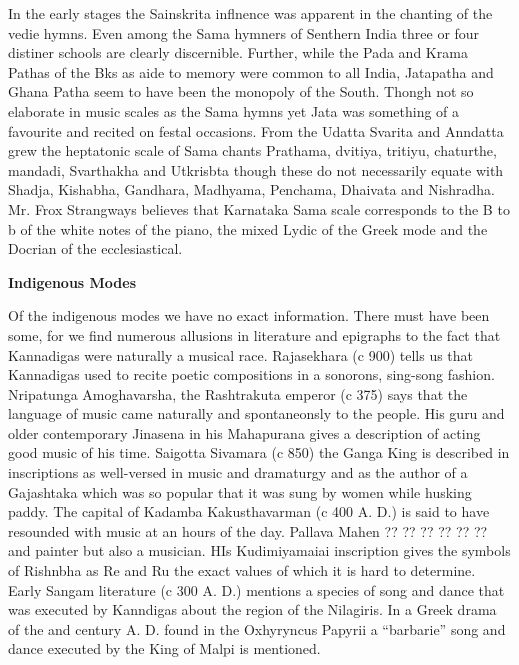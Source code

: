 \documentclass{book}
\begin{document}
In the early stages the Sainskrita inflnence was apparent in the
chanting of the vedie hymns. Even among the Sama hymners of Senthern
India three or four distiner schools are clearly discernible. Further,
while the Pada and Krama Pathas of the Bks as aide to memory were
common to all India, Jatapatha and Ghana Patha seem to have been the
monopoly of the South. Thongh not so elaborate in music scales as the
Sama hymns yet Jata was something of a favourite and recited on festal
occasions. From the Udatta Svarita and Anndatta grew the heptatonic
scale of Sama  chants Prathama, dvitiya, tritiyu, chaturthe, mandadi,
Svarthakha and Utkrisbta though these do not necessarily equate with
Shadja, Kishabha, Gandhara, Madhyama, Penchama, Dhaivata and
Nishradha. Mr. Frox Strangways believes that Karnataka Sama scale
corresponds to the B to b of the white notes of the piano, the mixed
Lydic of the Greek mode and the Docrian of the ecclesiastical.

\begin{center}
\textbf{Indigenous Modes}
\end{center}

Of the indigenous modes we have no exact information. There must have
been some, for we find numerous allusions in literature and epigraphs
to the fact that Kannadigas were naturally a musical race. Rajasekhara
(c 900) tells us that Kannadigas used to recite poetic compositions in
a sonorons, sing-song fashion. Nripatunga Amoghavarsha, the
Rashtrakuta emperor (c 375) says that the language of music came
naturally and spontaneonsly to the people. His guru and older
contemporary Jinasena in his Mahapurana gives a description of acting
good music of his time. Saigotta Sivamara (c 850) the Ganga King is
described in inscriptions as well-versed in music and dramaturgy and
as the author of a Gajashtaka which was so popular that it was sung by
women while husking paddy. The capital of Kadamba Kakusthavarman (c
400 A. D.) is said to have resounded with music at an hours of the
day. Pallava Mahen ?? ?? ?? ?? ?? ?? and painter but also a
musician. HIs Kudimiyamaiai inscription  gives the symbols of Rishnbha
as Re and Ru the exact values of which it is hard to  determine. Early
Sangam literature (c 300 A. D.) mentions a species of song and dance
that was executed by Kanndigas about the region of the Nilagiris. In a
Greek drama of the and century A. D. found in the Oxhyryncus Papyrii a
``barbarie'' song and dance executed by the King of Malpi is
mentioned. 
\end{document}
